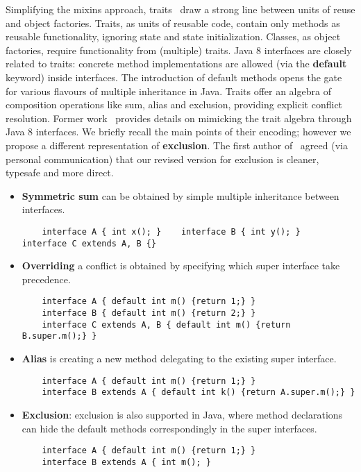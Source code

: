 Simplifying the mixins approach, traits~\cite{scharli03traits} draw a strong
line between units of reuse and object factories. Traits, as units of reusable
code, contain only methods as reusable functionality, ignoring state and state
initialization. Classes, as object factories, require functionality from
(multiple) traits. Java 8 interfaces are closely related to
traits: concrete method implementations are allowed (via the \textbf{default}
keyword) inside interfaces. The introduction of default methods opens the gate
for various flavours of multiple inheritance in Java. Traits offer an algebra
of composition operations like sum, alias and exclusion, providing explicit conflict
resolution. Former work~\cite{bono14} provides details on mimicking the trait
algebra through Java 8 interfaces.  We briefly recall the main points of their
encoding; however we propose a different representation of \textbf{exclusion}.
The first author of~\cite{bono14} agreed (via personal communication) that
our revised version for exclusion is cleaner, typesafe and more direct.
\newcommand\shortItem{\vspace{-1ex}}
\begin{itemize}
\item \textbf{Symmetric sum} can be obtained by simple multiple inheritance between interfaces.
    \begin{lstlisting}
    interface A { int x(); }    interface B { int y(); }    interface C extends A, B {}
    \end{lstlisting}
\shortItem
\item \textbf{Overriding} a conflict is obtained by specifying which super interface take precedence.
    \begin{lstlisting}
    interface A { default int m() {return 1;} }
    interface B { default int m() {return 2;} }
    interface C extends A, B { default int m() {return B.super.m();} }
    \end{lstlisting}
\shortItem
\item \textbf{Alias} is creating  a new method delegating to the existing super interface.
    \begin{lstlisting}
    interface A { default int m() {return 1;} }
    interface B extends A { default int k() {return A.super.m();} }
    \end{lstlisting}
\shortItem

\item \textbf{Exclusion}: exclusion is also supported in Java, where method declarations can hide the default methods correspondingly in the super interfaces.
    \begin{lstlisting}
    interface A { default int m() {return 1;} }
    interface B extends A { int m(); }
    \end{lstlisting}
\shortItem
\end{itemize}

